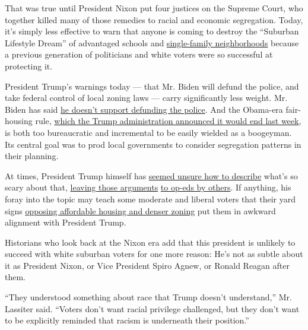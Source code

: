 That was true until President Nixon put four justices on the Supreme
Court, who together killed many of those remedies to racial and economic
segregation. Today, it's simply less effective to warn that anyone is
coming to destroy the ``Suburban Lifestyle Dream'' of advantaged schools
and
\href{https://www.nytimes3xbfgragh.onion/interactive/2019/06/18/upshot/cities-across-america-question-single-family-zoning.html}{single-family
neighborhoods} because a previous generation of politicians and white
voters were so successful at protecting it.

President Trump's warnings today --- that Mr. Biden will defund the
police, and take federal control of local zoning laws --- carry
significantly less weight. Mr. Biden has said
\href{https://www.npr.org/sections/live-updates-protests-for-racial-justice/2020/06/08/872376757/biden-opposes-defunding-police-campaign-says}{he
doesn't support defunding the police}. And the Obama-era fair-housing
rule,
\href{https://www.nytimes3xbfgragh.onion/2020/07/23/us/politics/trump-housing-discrimination-suburbs.html}{which
the Trump administration announced it would end last week}, is both too
bureaucratic and incremental to be easily wielded as a boogeyman. Its
central goal was to prod local governments to consider segregation
patterns in their planning.

At times, President Trump himself has
\href{https://twitter.com/realDonaldTrump/status/1278136326647406593}{seemed
unsure how to describe} what's so scary about that,
\href{https://twitter.com/realDonaldTrump/status/1286372175117791236}{leaving
those arguments}
\href{https://www.nationalreview.com/corner/biden-and-dems-are-set-to-abolish-the-suburbs/}{to
op-eds by others}. If anything, his foray into the topic may teach some
moderate and liberal voters that their yard signs
\href{https://www.nytimes3xbfgragh.onion/2018/08/21/upshot/home-ownership-nimby-bipartisan.html}{opposing
affordable housing and denser zoning} put them in awkward alignment with
President Trump.

Historians who look back at the Nixon era add that this president is
unlikely to succeed with white suburban voters for one more reason: He's
not as subtle about it as President Nixon, or Vice President Spiro
Agnew, or Ronald Reagan after them.

``They understood something about race that Trump doesn't understand,''
Mr. Lassiter said. ``Voters don't want racial privilege challenged, but
they don't want to be explicitly reminded that racism is underneath
their position.''

